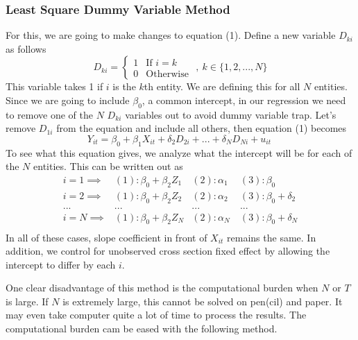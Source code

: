 \documentclass[12pt]{article}
\theoremstyle{definition}
\theoremstyle{property}
\theoremstyle{assumption}
\theoremstyle{example}
\theoremstyle{comment}
\begin{document}
\subsubsection{Least Square Dummy Variable Method}
For this, we are going to make changes to equation (1). Define a new variable $D_{ki}$ as follows
\[
D_{ki} = \begin{cases} 1 & \text{If $i=k$} \\
                                     0 & \text{Otherwise } \end{cases} , \ k\in\{1,2,...,N\}
\] 
This variable takes 1 if $i$ is the $k$th entity. We are defining this for all $N$ entities. Since we are going to include $\beta_0$, a common intercept, in our regression we need to remove one of the $N$ $D_{ki}$ variables out to avoid dummy variable trap. Let's remove $D_{1i}$ from the equation and include all others, then equation (1) becomes
\[
Y_{it} = \beta_0 +\beta_1X_{it}+\delta_2D_{2i} + ... + \delta_ND_{Ni}+u_{it} \ \tag{3, LSDV}
\]
To see what this equation gives, we analyze what the intercept will be for each of the $N$ entities. This can be written out as
\[
\begin{aligned}
i=1 \implies & (1): \beta_0 + \beta_2Z_1 &(2): \alpha_1 \ & (3): \beta_0\\ 
i=2 \implies & (1): \beta_0 + \beta_2Z_2 &(2): \alpha_2 \ & (3): \beta_0+\delta_2\\ 
...&...&...&...\\
i=N \implies & (1): \beta_0 + \beta_2Z_N &(2): \alpha_N \ & (3): \beta_0+\delta_N\\ 
\end{aligned}
\]
In all of these cases, slope coefficient in front of $X_{it}$ remains the same. In addition, we control for unobserved cross section fixed effect by allowing the intercept to differ by each $i$. \par\medskip
One clear disadvantage of this method is the computational burden when $N$ or $T$ is large. If $N$ is extremely large, this cannot be solved on pen(cil) and paper. It may even take computer quite a lot of time to process the results. The computational burden cam be eased with the following method. \par\medskip
\end{document}

